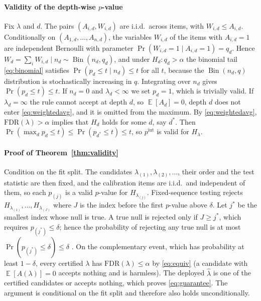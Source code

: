 \documentclass[preprint,12pt]{elsarticle}
\theoremstyle{definition}
\theoremstyle{remark}
\newcommand{\fdr}{\mathrm{FDR}}
\DeclareMathOperator{\E}{\mathbb{E}}
\DeclareMathOperator{\Bin}{Bin}
\begin{document}
\paragraph{Validity of the depth-wise $p$-value}
Fix $\lambda$ and $d$. The pairs $(A_{i,d},W_{i,d})$ are i.i.d.\ across items,
with $W_{i,d}\le A_{i,d}$. Conditionally on $(A_{1,d},\dots,A_{n,d})$, the
variables $W_{i,d}$ of the items with $A_{i,d}=1$ are independent Bernoulli with
parameter $\Pr(W_{i,d}=1\mid A_{i,d}=1)=q_d$. Hence
$W_d=\sum_i W_{i,d}\mid n_d\sim\Bin(n_d,q_d)$, and under $H_d:q_d>\alpha$ the
binomial tail \eqref{eq:binomial} satisfies $\Pr(p_d\le t\mid n_d)\le t$ for all
$t$, because the $\Bin(n_d,q)$ distribution is stochastically increasing in $q$.
Integrating over $n_d$ gives $\Pr(p_d\le t)\le t$. If $n_d=0$ and $\lambda_d<\infty$ we set $p_d=1$,
which is trivially valid. If $\lambda_d=\infty$ the rule cannot accept at depth
$d$, so $\E[A_d]=0$, depth $d$ does not enter \eqref{eq:weightedavg}, and it is
omitted from the maximum. By \eqref{eq:weightedavg}, $\fdr(\lambda)>\alpha$
implies that $H_d$ holds for some $d$, say $d^\ast$. Then
$\Pr(\max_d p_d\le t)\le\Pr(p_{d^\ast}\le t)\le t$, so $p^{\mathrm{iut}}$ is
valid for $H_\lambda$.

\paragraph{Proof of Theorem~\ref{thm:validity}}
Condition on the fit split. The candidates $\lambda_{(1)},\lambda_{(2)},\dots$,
their order and the test statistic are then fixed, and the calibration items are
i.i.d.\ and independent of them, so each $p_{(j)}$ is a valid $p$-value for
$H_{\lambda_{(j)}}$. Fixed-sequence testing rejects $H_{\lambda_{(1)}},\dots,
H_{\lambda_{(J)}}$ where $J$ is the index before the first $p$-value above
$\delta$. Let $j^\ast$ be the smallest index whose null is true. A true null is
rejected only if $J\ge j^\ast$, which requires $p_{(j^\ast)}\le\delta$; hence the
probability of rejecting any true null is at most
$\Pr(p_{(j^\ast)}\le\delta)\le\delta$ \cite{bauer1991multiple}. On the
complementary event, which has probability at least $1-\delta$, every certified
$\lambda$ has $\fdr(\lambda)\le\alpha$ by \eqref{eq:equiv} (a candidate with
$\E[A(\lambda)]=0$ accepts nothing and is harmless). The deployed $\hat\lambda$ is
one of the certified candidates or accepts nothing, which proves
\eqref{eq:guarantee}. The argument is conditional on the fit split and therefore
also holds unconditionally.
\end{document}
